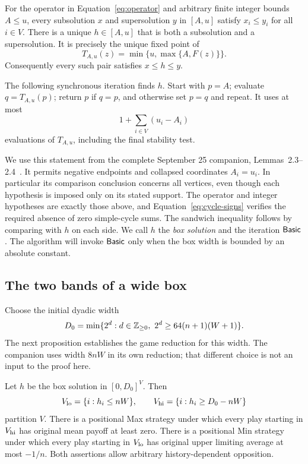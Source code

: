 \begin{lemma}
\label{lem:accepted-box}
For the operator in Equation~\eqref{eq:operator} and arbitrary finite
integer bounds $A\le u$, every subsolution $x$ and supersolution
$y$ in $[A,u]$ satisfy $x_i\le y_i$ for all $i\in V$. There is a
unique $h\in[A,u]$ that is both a subsolution and a supersolution.
It is precisely the unique fixed point of
\[
 T_{A,u}(z)=\min\{u,\max\{A,F(z)\}\}.
\]
Consequently every such pair satisfies $x\le h\le y$.

The following synchronous iteration finds $h$. Start with $p=A$;
evaluate $q=T_{A,u}(p)$; return $p$ if $q=p$, and otherwise set
$p=q$ and repeat. It uses at most
\[
                         1+\sum_{i\in V}(u_i-A_i)
\]
evaluations of $T_{A,u}$, including the final stability test.
\end{lemma}

We use this statement from the complete September 25 companion,
Lemmas~2.3--2.4~\cite{OpenAI2026Randomized}. It permits negative
endpoints and collapsed coordinates $A_i=u_i$. In particular its
comparison conclusion concerns all vertices, even though each
hypothesis is imposed only on its stated support. The operator and
integer hypotheses are exactly those above, and
Equation~\eqref{eq:cycle-signs} verifies the required absence of zero
simple-cycle sums. The sandwich inequality follows by comparing with
$h$ on each side. We call $h$ the \emph{box solution} and the
iteration $\mathsf{Basic}$. The algorithm will invoke $\mathsf{Basic}$ only when
the box width is bounded by an absolute constant.

\subsection{The two bands of a wide box}

Choose the initial dyadic width
\begin{equation}
 D_0=\min\{2^d:d\in\Z_{\ge0},\ 2^d\ge64(n+1)(W+1)\}.
 \label{eq:initial-width}
\end{equation}
The next proposition establishes the game reduction for this width.
The companion uses width $8nW$ in its own reduction; that different
choice is not an input to the proof here.

\begin{proposition}
\label{prop:game-reduction}
Let $h$ be the box solution in $[0,D_0]^V$. Then
\[
 V_{\mathrm{lo}}=\{i:h_i\le nW\},\qquad
 V_{\mathrm{hi}}=\{i:h_i\ge D_0-nW\}
\]
partition $V$. There is a positional Max strategy under which every
play starting in $V_{\mathrm{hi}}$ has original mean payoff at least zero.
There is a positional Min strategy under which every play starting
in $V_{\mathrm{lo}}$ has original upper limiting average at most $-1/n$.
Both assertions allow arbitrary history-dependent opposition.
\end{proposition}

